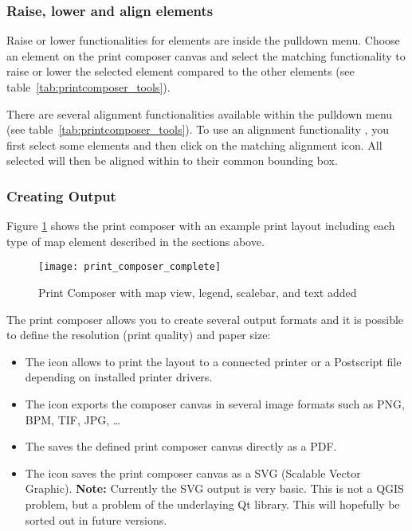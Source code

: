 \subsubsection{Raise, lower and align elements}

Raise or lower functionalities for elements are inside the
 pulldown menu. Choose an
element on the print composer canvas and select the matching functionality to
raise or lower the selected element compared to the other elements (see
table~\ref{tab:printcomposer_tools}). 

There are several alignment functionalities available within the
 pulldown menu (see
table~\ref{tab:printcomposer_tools}). To use an alignment functionality , you
first select some elements and then click on the matching alignment icon. All
selected will then be aligned within to their common bounding box.       

\subsubsection{Creating Output}

Figure \ref{fig:print_composer_complete} shows the print composer with an example 
print layout including each type of map element described in the sections above.

\begin{figure}[h]
   \begin{center}
   \caption{Print Composer with map view, legend, scalebar, and text added \nixcaption}
   \label{fig:print_composer_complete}\smallskip
   \texttt{[image: print\_composer\_complete]}
\end{center}  
\end{figure}

The print composer allows you to create several output formats and it is possible to 
define the resolution (print quality) and paper size:

\begin{itemize}
\item The  icon allows to print the layout 
to a connected printer or a Postscript file depending on installed printer 
drivers.
\item The  icon exports the 
composer canvas in several image formats such as PNG, BPM, TIF, JPG, \dots
\item The  saves the defined
print composer canvas directly as a PDF.
\item The  icon saves the print 
composer canvas as a SVG (Scalable Vector Graphic). \textbf{Note:} Currently the 
SVG output is very basic. This is not a QGIS problem, but a problem of the underlaying 
Qt library. This will hopefully be sorted out in future versions.
\end{itemize}

